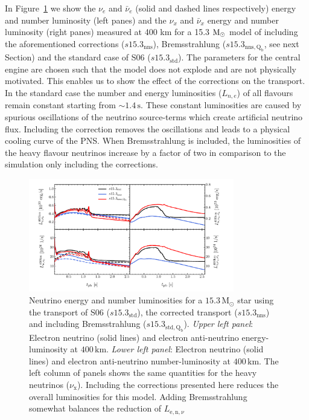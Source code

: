 \documentclass[fleqn,usenatbib]{mnras}
\newcommand{\solm}{\ensuremath{\rm{M_{\odot}}}\xspace}
\newcommand{\s}{\ensuremath{\text{s}}}
\begin{document}
In Figure~\ref{fig:s15.3 trans} we show the $\nu_{e}$ and $\bar{\nu}_{e}$ (solid and dashed lines respectively) energy and number luminosity (left panes) and  the $\nu_{x}$ and $\bar{\nu}_{x}$ energy and number luminosity (right panes) measured at 400 km for a 15.3 \solm model of \cite{Ertl2016} including the aforementioned corrections ($s15.3_{\mathrm{nns}}$), Bremsstrahlung ($s15.3_{\mathrm{nns,Q_{b}}}$, see next Section) and the standard case of S06 ($s15.3_{\mathrm{std}}$).
The parameters for the central engine are chosen such that the model does not explode and are not physically motivated. This enables us to show the effect of the corrections on the transport. 
In the standard case the number and energy luminosities ($L_{n,e}$) of all flavours remain constant starting from $\mathord{\sim}1.4\,\s$. These constant luminosities are caused by spurious oscillations of the neutrino source-terms which create artificial neutrino flux. Including the correction removes the oscillations and leads to a physical cooling curve of the PNS. 
When Bremsstrahlung is included, the luminosities of the heavy flavour neutrinos increase by a factor of two in comparison to the simulation only including the corrections. 

\begin{figure}
\centering
\includegraphics[width=0.8\textwidth]{./pic/s15_3_trans_tests.pdf}
\caption{Neutrino energy and number luminosities for a $15.3\,\mathrm{M_{\odot}}$ star using the transport of S06 ($s15.3_{\mathrm{std}}$), the corrected transport ($s15.3_{\mathrm{nns}}$) and including Bremsstrahlung ($s15.3_{\mathrm{std,Q_b}}$). \textit{Upper left panel}: Electron neutrino (solid lines) and electron anti-neutrino energy-luminosity at $400\,\mathrm{km}$. \textit{Lower left panel}: Electron neutrino (solid lines) and electron anti-neutrino number-luminosity at $400\,\mathrm{km}$. The left column of panels shows the same quantities for the heavy neutrinos ($\nu_{\mathrm{x}}$). Including the corrections presented here reduces the overall luminosities for this model. Adding Bremsstrahlung somewhat balances the reduction of $L_{\mathrm{e,n},\nu}$}
\label{fig:s15.3 trans}
\end{figure}
\end{document}
